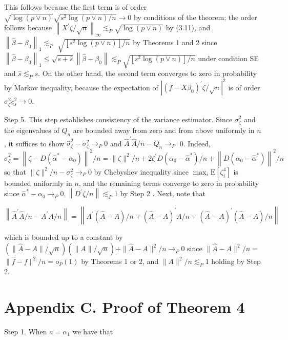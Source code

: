 \documentclass[10pt]{article}
\begin{document}
This follows because the first term is of order \(\sqrt{\log (p \vee n)} \sqrt{s^{2} \log (p \vee n) / n} \rightarrow 0\) by conditions of the theorem; the order follows because \(\left\|X^{\prime} \zeta / \sqrt{n}\right\|_{\infty} \lesssim_{P} \sqrt{\log (p \vee n)}\) by (3.11), and \(\left\|\widehat{\beta}-\beta_{0}\right\|_{1} \lesssim_{P}\) \(\sqrt{\left[s^{2} \log (p \vee n)\right] / n}\) by Theorems 1 and 2 since \(\left\|\widehat{\beta}-\beta_{0}\right\|_{1} \leqslant \sqrt{s+\widehat{s}}\left\|\widehat{\beta}-\beta_{0}\right\| \lesssim_{P} \sqrt{\left[s^{2} \log (p \vee n)\right] / n}\) under condition SE and \(\widehat{s} \lesssim_{P} s\). On the other hand, the second term converges to zero in probability by Markov inequality, because the expectation of \(\left|\left(f-X \beta_{0}\right)^{\prime} \zeta / \sqrt{n}\right|^{2}\) is of order \(\sigma_{\zeta}^{2} c_{s}^{2} \rightarrow 0\).

Step 5. This step establishes consistency of the variance estimator. Since \(\sigma_{\zeta}^{2}\) and the eigenvalues of \(Q_{n}\) are bounded away from zero and from above uniformly in \(n\), it suffices to show \(\widehat{\sigma}_{\zeta}^{2}-\sigma_{\zeta}^{2} \rightarrow_{P} 0\) and \(\widehat{A}^{\prime} \widehat{A} / n-Q_{n} \rightarrow_{P}\) 0. Indeed, \(\widehat{\sigma}_{\zeta}^{2}=\left\|\zeta-D\left(\widehat{\alpha}^{*}-\alpha_{0}\right)\right\|^{2} / n=\|\zeta\|^{2} / n+2 \zeta^{\prime} D\left(\alpha_{0}-\widehat{\alpha}^{*}\right) / n+\left\|D\left(\alpha_{0}-\widehat{\alpha}^{*}\right)\right\|^{2} / n\) so that \(\|\zeta\|^{2} / n-\sigma_{\zeta}^{2} \rightarrow_{P} 0\) by Chebyshev inequality since \(\max _{i} \mathrm{E}\left[\zeta_{i}^{4}\right]\) is bounded uniformly in \(n\), and the remaining terms converge to zero in probability since \(\widehat{\alpha}^{*}-\alpha_{0} \rightarrow_{P} 0,\left\|D^{\prime} \zeta / n\right\| \lesssim_{P} 1\) by Step 2 . Next, note that

\[
\left\|\widehat{A}^{\prime} \widehat{A} / n-A^{\prime} A / n\right\|=\left\|A^{\prime}(\widehat{A}-A) / n+(\widehat{A}-A)^{\prime} A / n+(\widehat{A}-A)^{\prime}(\widehat{A}-A) / n\right\|
\]

which is bounded up to a constant by \((\|\widehat{A}-A\| / \sqrt{n})(\|A\| / \sqrt{n})+\|\widehat{A}-A\|^{2} / n \rightarrow_{P} 0\) since \(\|\widehat{A}-A\|^{2} / n=\) \(\|\widehat{f}-f\|^{2} / n=o_{P}(1)\) by Theorems 1 or 2, and \(\|A\|^{2} / n \lesssim_{P} 1\) holding by Step 2.

\section*{Appendix C. Proof of Theorem 4}
Step 1. When \(a=\alpha_{1}\) we have that
\end{document}

